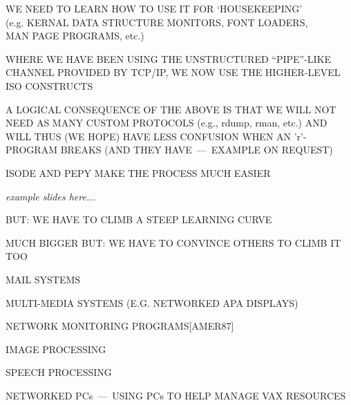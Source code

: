 \begin{bwslide}

\begin{nrtc}
\item	WE NEED TO LEARN HOW TO USE IT FOR `HOUSEKEEPING'\\
	(e.g. KERNAL DATA STRUCTURE MONITORS, FONT LOADERS,\\
	MAN PAGE PROGRAMS, etc.)

\item	WHERE WE HAVE BEEN USING THE UNSTRUCTURED ``PIPE''-LIKE CHANNEL
	PROVIDED BY TCP/IP, WE NOW USE THE HIGHER-LEVEL ISO CONSTRUCTS

\item	A LOGICAL CONSEQUENCE OF THE ABOVE IS THAT WE WILL NOT NEED AS
	MANY CUSTOM PROTOCOLS (e.g., rdump, rman, etc.)
	AND WILL THUS (WE HOPE) HAVE LESS CONFUSION WHEN AN 'r'-PROGRAM
	BREAKS (AND THEY HAVE~---~EXAMPLE ON REQUEST)

\item	ISODE AND PEPY MAKE THE PROCESS MUCH EASIER
\end{nrtc}
\end{bwslide}


\begin{note}\em
example slides here...
\end{note}

\begin{bwslide}

\begin{nrtc}
\item	BUT: WE HAVE TO CLIMB A STEEP LEARNING CURVE

\item	MUCH BIGGER BUT: WE HAVE TO CONVINCE OTHERS TO CLIMB IT TOO
\end{nrtc}
\end{bwslide}


\begin{bwslide}

\begin{nrtc}
\item	MAIL SYSTEMS

\item	MULTI-MEDIA SYSTEMS (E.G. NETWORKED APA DISPLAYS)

\item	NETWORK MONITORING PROGRAMS[AMER87]

\item	IMAGE PROCESSING

\item	SPEECH PROCESSING

\item	NETWORKED PCs~---~USING PCs TO HELP MANAGE VAX RESOURCES
\end{nrtc}
\end{bwslide}


